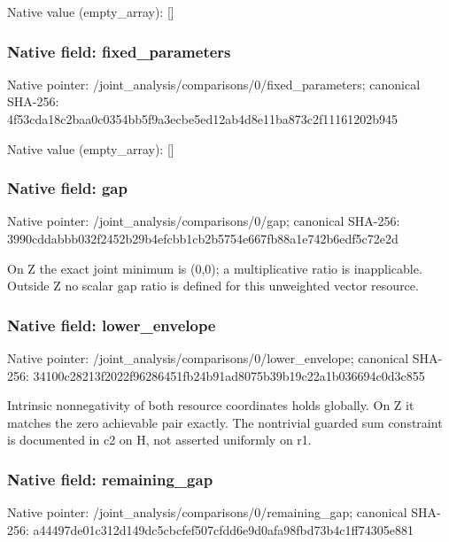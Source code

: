\documentclass[10pt,a4paper]{article}
\begin{document}
Native value (empty\_\allowbreak{}array): []

\subsubsection{Native field: fixed\_\allowbreak{}parameters}
Native pointer: /joint\_\allowbreak{}analysis/comparisons/0/fixed\_\allowbreak{}parameters; canonical SHA-256: 4f53cda18c2baa0c0354bb5f9a3ecbe5ed12ab4d8e11ba873c2f11161202b945

Native value (empty\_\allowbreak{}array): []

\subsubsection{Native field: gap}
Native pointer: /joint\_\allowbreak{}analysis/comparisons/0/gap; canonical SHA-256: 3990cddabbb032f2452b29b4efcbb1cb2b5754e667fb88a1e742b6edf5c72e2d

\begingroup\raggedright\sloppy On Z the exact joint minimum is (0,\allowbreak{}0);\allowbreak{} a multiplicative ratio is inapplicable. Outside Z no scalar gap ratio is defined for this unweighted vector resource.\par\endgroup

\subsubsection{Native field: lower\_\allowbreak{}envelope}
Native pointer: /joint\_\allowbreak{}analysis/comparisons/0/lower\_\allowbreak{}envelope; canonical SHA-256: 34100c28213f2022f96286451fb24b91ad8075b39b19c22a1b036694c0d3c855

\begingroup\raggedright\sloppy Intrinsic nonnegativity of both resource coordinates holds globally. On Z it matches the zero achievable pair exactly. The nontrivial guarded sum constraint is documented in c2 on H,\allowbreak{} not asserted uniformly on r1.\par\endgroup

\subsubsection{Native field: remaining\_\allowbreak{}gap}
Native pointer: /joint\_\allowbreak{}analysis/comparisons/0/remaining\_\allowbreak{}gap; canonical SHA-256: a44497de01c312d149dc5cbcfef507cfdd6e9d0afa98fbd73b4c1ff74305e881
\end{document}
